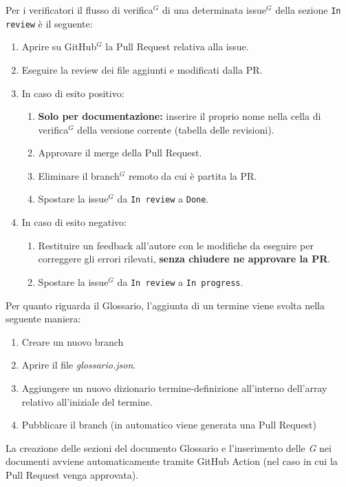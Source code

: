 \documentclass[a4paper,10pt]{article}
\begin{document}
Per i verificatori il flusso di verifica$^G$ di una determinata issue$^G$ della sezione \texttt{In review} è il seguente:
\begin{enumerate}
  \item Aprire su GitHub$^G$ la Pull Request relativa alla issue.
  \item Eseguire la review dei file aggiunti e modificati dalla PR.
  \item[-] In caso di esito positivo:
    \begin{enumerate}[start=3, label=\arabic*.]
      \item \textbf{Solo per documentazione:} inserire il proprio nome nella cella di verifica$^G$ della versione corrente (tabella delle revisioni). 
      \item Approvare il merge della Pull Request.
      \item Eliminare il branch$^G$ remoto da cui è partita la PR.
      \item Spostare la issue$^G$ da \texttt{In review} a \texttt{Done}.
    \end{enumerate}
  \item[-] In caso di esito negativo:
    \begin{enumerate}[start=3, label=\arabic*.]
      \item Restituire un feedback all'autore con le modifiche da eseguire per correggere gli errori rilevati, \textbf{senza chiudere ne approvare la PR}.
      \item Spostare la issue$^G$ da \texttt{In review} a \texttt{In progress}.
    \end{enumerate}
\end{enumerate}

Per quanto riguarda il Glossario, l'aggiunta di un termine viene svolta nella seguente maniera:
\begin{enumerate}
  \item Creare un nuovo branch
  \item Aprire il file \textit{glossario.json}.
  \item Aggiungere un nuovo dizionario termine-definizione all'interno dell'array relativo all'iniziale del termine.
  \item Pubblicare il branch (in automatico viene generata una Pull Request)
\end{enumerate}
La creazione delle sezioni del documento Glossario e l'inserimento delle \textit{G} nei documenti avviene automaticamente tramite GitHub Action (nel caso in cui la Pull Request venga approvata).
\end{document}
